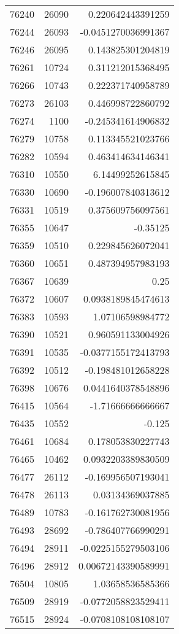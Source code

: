 \begin{tabular}{r | r | r}
76240 & 26090 & 0.220642443391259 \\
76244 & 26093 & -0.0451270036991367 \\
76246 & 26095 & 0.143825301204819 \\
76261 & 10724 & 0.311212015368495 \\
76266 & 10743 & 0.222371740958789 \\
76273 & 26103 & 0.446998722860792 \\
76274 & 1100 & -0.245341614906832 \\
76279 & 10758 & 0.113345521023766 \\
76282 & 10594 & 0.463414634146341 \\
76310 & 10550 & 6.14499252615845 \\
76330 & 10690 & -0.196007840313612 \\
76331 & 10519 & 0.375609756097561 \\
76355 & 10647 & -0.35125 \\
76359 & 10510 & 0.229845626072041 \\
76360 & 10651 & 0.487394957983193 \\
76367 & 10639 & 0.25 \\
76372 & 10607 & 0.0938189845474613 \\
76383 & 10593 & 1.07106598984772 \\
76390 & 10521 & 0.960591133004926 \\
76391 & 10535 & -0.0377155172413793 \\
76392 & 10512 & -0.198481012658228 \\
76398 & 10676 & 0.0441640378548896 \\
76415 & 10564 & -1.71666666666667 \\
76435 & 10552 & -0.125 \\
76461 & 10684 & 0.178053830227743 \\
76465 & 10462 & 0.0932203389830509 \\
76477 & 26112 & -0.169956507193041 \\
76478 & 26113 & 0.03134369037885 \\
76489 & 10783 & -0.161762730081956 \\
76493 & 28692 & -0.786407766990291 \\
76494 & 28911 & -0.0225155279503106 \\
76496 & 28912 & 0.00672143390589991 \\
76504 & 10805 & 1.03658536585366 \\
76509 & 28919 & -0.0772058823529411 \\
76515 & 28924 & -0.0708108108108107 \\

\end{tabular}
